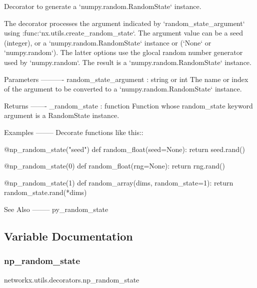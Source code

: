 \begin{DoxyVerb}Decorator to generate a `numpy.random.RandomState` instance.

The decorator processes the argument indicated by `random_state_argument`
using :func:`nx.utils.create_random_state`.
The argument value can be a seed (integer), or a `numpy.random.RandomState`
instance or (`None` or `numpy.random`). The latter options use the glocal
random number generator used by `numpy.random`.
The result is a `numpy.random.RandomState` instance.

Parameters
----------
random_state_argument : string or int
    The name or index of the argument to be converted
    to a `numpy.random.RandomState` instance.

Returns
-------
_random_state : function
    Function whose random_state keyword argument is a RandomState instance.

Examples
--------
Decorate functions like this::

   @np_random_state("seed")
   def random_float(seed=None):
       return seed.rand()

   @np_random_state(0)
   def random_float(rng=None):
       return rng.rand()

   @np_random_state(1)
   def random_array(dims, random_state=1):
       return random_state.rand(*dims)

See Also
--------
py_random_state
\end{DoxyVerb}
 

\subsection{Variable Documentation}
\mbox{\label{namespacenetworkx_1_1utils_1_1decorators_a2878a448026ebcbeda1f29e7f3506cd5}} 
\subsubsection{\texorpdfstring{np\+\_\+random\+\_\+state}{np\_random\_state}}
{\footnotesize\ttfamily networkx.\+utils.\+decorators.\+np\+\_\+random\+\_\+state}

